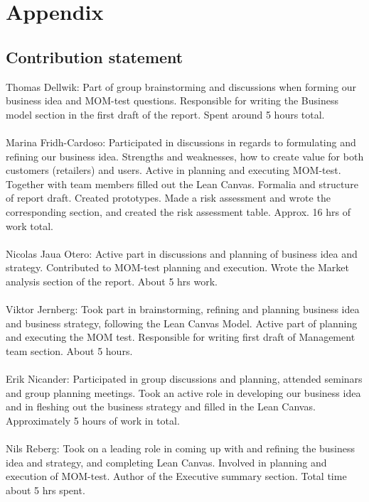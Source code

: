 \documentclass[titlepage]{article}
\begin{document}
\section{Appendix}
\subsection{Contribution statement}
Thomas Dellwik: Part of group brainstorming and discussions when forming our business idea and MOM-test questions. Responsible for writing the Business model section in the first draft of the report. Spent around 5 hours total. \\
\\
Marina Fridh-Cardoso: Participated in discussions in regards to formulating and refining our business idea. Strengths and weaknesses, how to create value for both customers (retailers) and users. Active in planning and executing MOM-test. Together with team members filled out the Lean Canvas. Formalia and structure of report draft. Created prototypes. Made a risk assessment and wrote the corresponding section, and created the risk assessment table. Approx. 16 hrs of work total. \\
\\
Nicolas Jaua Otero: Active part in discussions and planning of business idea and strategy. Contributed to MOM-test planning and execution. Wrote the Market analysis section of the report. About 5 hrs work.\\
\\
Viktor Jernberg: Took part in brainstorming, refining and planning business idea and business strategy, following the Lean Canvas Model. Active part of planning and executing the MOM test. Responsible for writing first draft of Management team section. About 5 hours.\\
\\
Erik Nicander: Participated in group discussions and planning, attended seminars and group planning meetings. Took an active role in developing our business idea and in fleshing out the business strategy and filled in the Lean Canvas. Approximately 5 hours of work in total.\\
\\
Nils Reberg: Took on a leading role in coming up with and refining the business idea and strategy, and completing Lean Canvas.  Involved in planning and execution of MOM-test. Author of the Executive summary section. Total time about 5 hrs spent.\\



\end{document}
